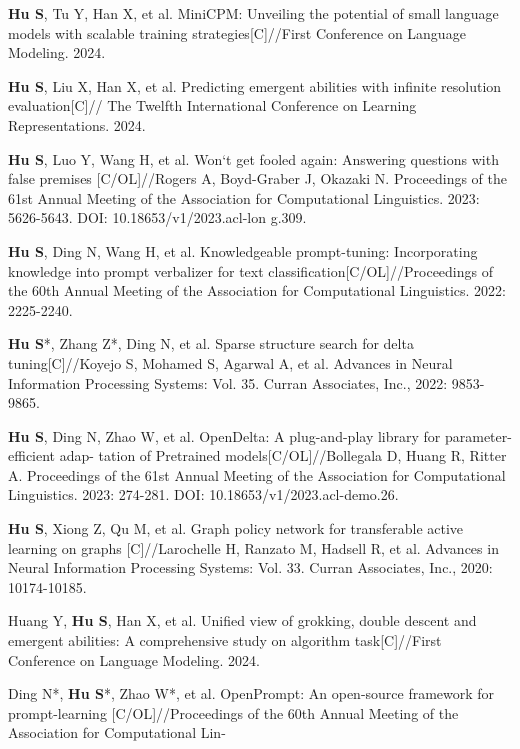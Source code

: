 \begin{resume}
\begin{achievements}
    \item \textbf{Hu S}, Tu Y, Han X, et al. MiniCPM: Unveiling the potential of small language models with
    scalable training strategies[C]//First Conference on Language Modeling. 2024.
      \item \textbf{Hu S}, Liu X, Han X, et al. Predicting emergent abilities with infinite resolution evaluation[C]//
      The Twelfth International Conference on Learning Representations. 2024.
      \item \textbf{Hu S}, Luo Y, Wang H, et al. Won‘t get fooled again: Answering questions with false premises
      [C/OL]//Rogers A, Boyd-Graber J, Okazaki N. Proceedings of the 61st Annual Meeting of
      the Association for Computational Linguistics. 2023: 5626-5643. DOI: 10.18653/v1/2023.acl-lon
      g.309.
      \item \textbf{Hu S}, Ding N, Wang H, et al. Knowledgeable prompt-tuning: Incorporating knowledge into
      prompt verbalizer for text classification[C/OL]//Proceedings of the 60th Annual Meeting of the
      Association for Computational Linguistics. 2022: 2225-2240. 
      \item \textbf{Hu S}*, Zhang Z*, Ding N, et al. Sparse structure search for delta tuning[C]//Koyejo S, Mohamed
      S, Agarwal A, et al. Advances in Neural Information Processing Systems: Vol. 35. Curran
      Associates, Inc., 2022: 9853-9865.
      \item \textbf{Hu S}, Ding N, Zhao W, et al. OpenDelta: A plug-and-play library for parameter-efficient adap-
      tation of Pretrained models[C/OL]//Bollegala D, Huang R, Ritter A. Proceedings of the 61st
      Annual Meeting of the Association for Computational Linguistics. 2023: 274-281. DOI:
      10.18653/v1/2023.acl-demo.26.
      \item \textbf{Hu S}, Xiong Z, Qu M, et al. Graph policy network for transferable active learning on graphs
      [C]//Larochelle H, Ranzato M, Hadsell R, et al. Advances in Neural Information Processing
      Systems: Vol. 33. Curran Associates, Inc., 2020: 10174-10185.
      \item Huang Y, \textbf{Hu S}, Han X, et al. Unified view of grokking, double descent and emergent abilities:
      A comprehensive study on algorithm task[C]//First Conference on Language Modeling. 2024.
      \item Ding N*, \textbf{Hu S}*, Zhao W*, et al. OpenPrompt: An open-source framework for prompt-learning
      [C/OL]//Proceedings of the 60th Annual Meeting of the Association for Computational Lin-

\end{achievements}
\end{resume}
